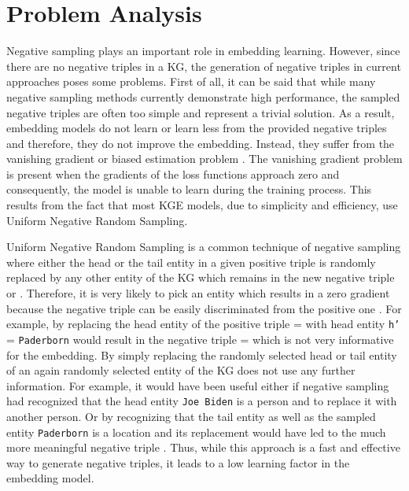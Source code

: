\section{Problem Analysis}
\label{sec:problem_analysis}

Negative sampling plays an important role in embedding learning.
However, since there are no negative triples in a \ac{KG}, the generation of negative triples in current approaches poses some problems.
First of all, it can be said that while many negative sampling methods currently demonstrate high performance, the sampled negative triples are often too simple and represent a trivial solution. 
As a result, embedding models do not learn or learn less from the provided negative triples and therefore, they do not improve the embedding.
Instead, they suffer from the vanishing gradient or biased estimation problem \cite{zhang2021efficient}.
The vanishing gradient problem is present when the gradients of the loss functions approach zero and consequently, the model is unable to learn during the training process.
This results from the fact that most \ac{KGE} models, due to simplicity and efficiency, use Uniform Negative Random Sampling.

Uniform Negative Random Sampling is a common technique of negative sampling where either the head or the tail entity in a given positive triple  is randomly replaced by any other entity of the \ac{KG} which remains in the new negative triple  or . 
Therefore, it is very likely to pick an entity which results in a zero gradient because the negative triple can be easily discriminated from the positive one \cite{cai2017kbgan}.
For example, by replacing the head entity of the positive triple  =  with head entity \texttt{h'} = \texttt{Paderborn} would result in the negative triple  =   which is not very informative for the embedding.
By simply replacing the randomly selected head or tail entity of an again randomly selected entity of the \ac{KG} does not use any further information.
For example, it would have been useful either if negative sampling had recognized that the head entity \texttt{Joe Biden} is a person and to replace it with another person.
Or by recognizing that the tail entity as well as the sampled entity \texttt{Paderborn} is a location and its replacement would have led to the much more meaningful negative triple .  
Thus, while this approach is a fast and effective way to generate negative triples, it leads to a low learning factor in the embedding model.

